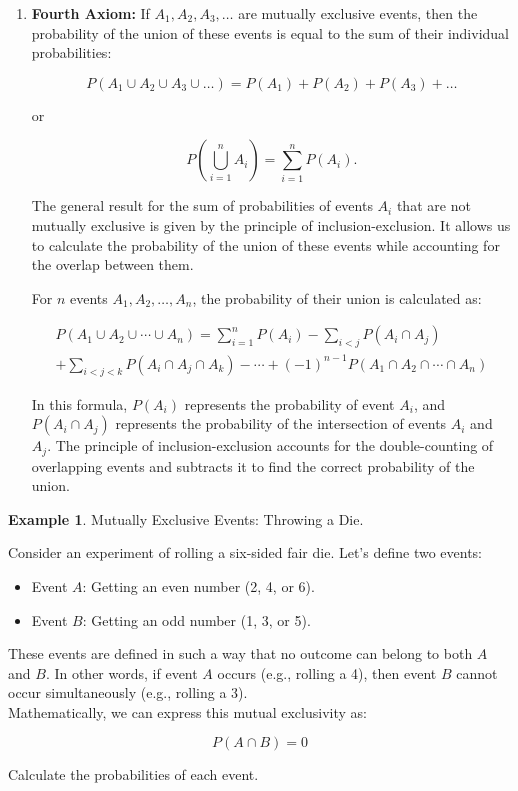 \documentclass[12pt]{book}
\theoremstyle{definition}
\newtheorem{exmp}{Example}[chapter]
\begin{document}
\begin{enumerate}
\item \textbf{Fourth Axiom:} If \(A_1, A_2, A_3, \ldots\) are mutually exclusive events, then the probability of the union of these events is equal to the sum of their individual probabilities:

\[
P(A_1 \cup A_2 \cup A_3 \cup \ldots) = P(A_1) + P(A_2) + P(A_3) + \ldots
\]

or

\[
P\left(\bigcup_{i=1}^{n} A_i\right) = \sum_{i=1}^{n} P(A_i).
\]

The general result for the sum of probabilities of events \(A_i\) that are not mutually exclusive is given by the principle of inclusion-exclusion. It allows us to calculate the probability of the union of these events while accounting for the overlap between them.

For \(n\) events \(A_1, A_2, \ldots, A_n\), the probability of their union is calculated as:

\begin{multline*}
P(A_1 \cup A_2 \cup \cdots \cup A_n) = 
    \sum_{i=1}^n P(A_i) 
    - \sum_{i<j} P(A_i \cap A_j) \\
    + \sum_{i<j<k} P(A_i \cap A_j \cap A_k) 
    - \cdots 
    + (-1)^{n-1}P(A_1 \cap A_2 \cap \cdots \cap A_n)
\end{multline*}

In this formula, \(P(A_i)\) represents the probability of event \(A_i\), and \(P(A_i \cap A_j)\) represents the probability of the intersection of events \(A_i\) and \(A_j\). The principle of inclusion-exclusion accounts for the double-counting of overlapping events and subtracts it to find the correct probability of the union.

\end{enumerate}

\begin{tcolorbox}
\begin{exmp}{Mutually Exclusive Events: Throwing a Die.}


Consider an experiment of rolling a six-sided fair die. Let's define two events:

\begin{itemize}
    \item Event \(A\): Getting an even number (2, 4, or 6).
    \item Event \(B\): Getting an odd number (1, 3, or 5).
\end{itemize}


These events are defined in such a way that no outcome can belong to both \(A\) and \(B\). In other words, if event \(A\) occurs (e.g., rolling a 4), then event \(B\) cannot occur simultaneously (e.g., rolling a 3).\\

Mathematically, we can express this mutual exclusivity as:

\[
P(A \cap B) = 0
\]

Calculate the probabilities of each event.

\end{exmp}
\end{tcolorbox}
\end{document}
